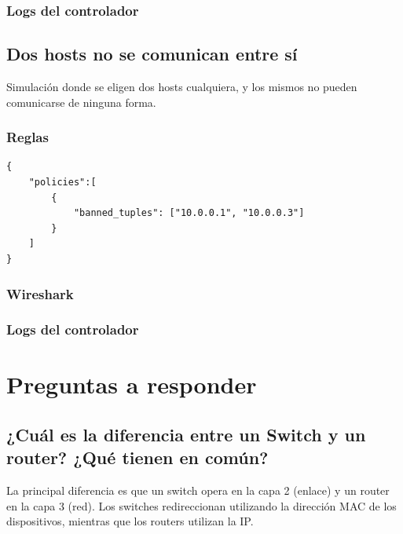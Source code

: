 \documentclass{article}
\begin{document}
\subsubsection{Logs del controlador}
\begin{center}
\end{center}

\subsection{Dos hosts no se comunican entre sí}
Simulación donde se eligen dos hosts cualquiera, y los mismos no pueden comunicarse de ninguna forma.

\subsubsection{Reglas}
\begin{verbatim}
{
    "policies":[
        {
            "banned_tuples": ["10.0.0.1", "10.0.0.3"]
        }
    ]
}
\end{verbatim}

\subsubsection{Wireshark}
\begin{center}
\end{center}

\subsubsection{Logs del controlador}
\begin{center}
\end{center}

\newpage
\section{Preguntas a responder}\label{preguntas-a-responder}

\subsection{¿Cuál es la diferencia entre un Switch y un router? ¿Qué tienen en común?}

La principal diferencia es que un switch opera en la capa 2 (enlace) y un router en la capa 3 (red). Los switches redireccionan utilizando la dirección MAC de los dispositivos, mientras que los routers utilizan la IP.
\end{document}
